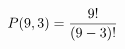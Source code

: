 \documentclass[preview]{standalone}
\begin{document}
\begin{align*}
\special{dvisvgm:raw <g id='unique000'>}P(9,3) = \frac{9!}{(9-3)!}\special{dvisvgm:raw </g>}
\end{align*}
\end{document}
